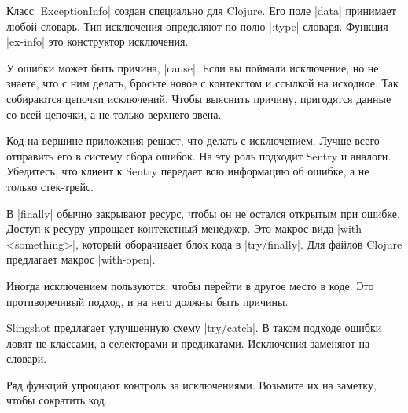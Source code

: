 Класс \spverb|ExceptionInfo| создан специально для Clojure. Его поле
\spverb|data| принимает любой словарь. Тип исключения определяют по полю
\spverb|:type| словаря. Функция \spverb|ex-info| это конструктор исключения.

У ошибки может быть причина, \spverb|cause|. Если вы поймали исключение, но не
знаете, что с ним делать, бросьте новое с контекстом и ссылкой на исходное. Так
собираются цепочки исключений. Чтобы выяснить причину, пригодятся данные со всей
цепочки, а не только верхнего звена.

Код на вершине приложения решает, что делать с исключением. Лучше всего
отправить его в систему сбора ошибок. На эту роль подходит Sentry и
аналоги. Убедитесь, что клиент к Sentry передает всю информацию об ошибке, а не
только стек-трейс.

В \spverb|finally| обычно закрывают ресурс, чтобы он не остался открытым при
ошибке. Доступ к ресуру упрощает контекстный менеджер. Это макрос вида
\spverb|with-<something>|, который оборачивает блок кода в
\spverb|try/finally|. Для файлов Clojure предлагает макрос \spverb|with-open|.

Иногда исключением пользуются, чтобы перейти в другое место в коде. Это
противоречивый подход, и на него должны быть причины.

Slingshot предлагает улучшенную схему \spverb|try/catch|. В таком подходе
ошибки ловят не классами, а селекторами и предикатами. Исключения заменяют на
словари.

Ряд функций упрощают контроль за исключениями. Возьмите их на заметку, чтобы
сократить код.
